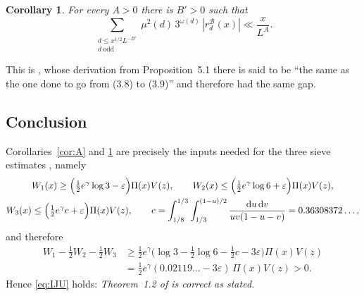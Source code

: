 \documentclass[11pt]{amsart}
\newtheorem{corollary}[theorem]{Corollary}
\theoremstyle{remark}
\newcommand{\dd}{\mathrm{d}}
\newcommand{\e}{\varepsilon}
\begin{document}
\begin{corollary}\label{cor:B}
For every $A>0$ there is $B'>0$ such that
\[
\sum_{\substack{d\le x^{1/2}L^{-B'}\\ d\ \mathrm{odd}}}\mu^2(d)\,3^{\omega(d)}\,|r^{\mathcal B}_d(x)|\ll\frac{x}{L^{A}}.
\]
\end{corollary}

This is \cite[(5.9)]{IJU}, whose derivation from Proposition~5.1 there is said to be ``the same as the one done to go from (3.8) to (3.9)'' and therefore had the same gap.

\subsection{Conclusion}
Corollaries~\ref{cor:A} and \ref{cor:B} are precisely the inputs \cite[(3.9) and (5.9)]{IJU} needed for the three sieve estimates \cite[(3.13), (4.3), (5.10)]{IJU}, namely
\begin{gather*}
W_1(x)\ge\Bigl(\tfrac12e^{\gamma}\log 3-\e\Bigr)\Pi(x)V(z),\qquad
W_2(x)\le\Bigl(\tfrac12e^{\gamma}\log 6+\e\Bigr)\Pi(x)V(z),\\
W_3(x)\le\Bigl(\tfrac12e^{\gamma}c+\e\Bigr)\Pi(x)V(z),\qquad
c=\int_{1/8}^{1/3}\int_{1/3}^{(1-u)/2}\frac{\dd u\,\dd v}{uv(1-u-v)}=0.36308372\ldots,
\end{gather*}
and therefore
\begin{align*}
W_1-\tfrac12W_2-\tfrac12W_3&\ge\tfrac12 e^{\gamma}\bigl(\log 3-\tfrac12\log 6-\tfrac12 c-3\e\bigr)\Pi(x)V(z)\\
&=\tfrac12 e^{\gamma}(0.02119\ldots-3\e)\,\Pi(x)V(z)>0 .
\end{align*}
Hence \eqref{eq:IJU} holds: \emph{Theorem~1.2 of \cite{IJU} is correct as stated.}
\end{document}
